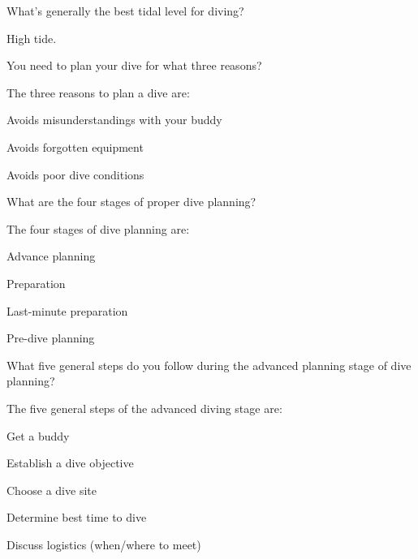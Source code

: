 	\begin{qanda}
		\begin{question}
What's generally the best tidal level for diving?
		\end{question}

		\begin{answer}
High tide.
		\end{answer}
	\end{qanda}

	\begin{qanda}
		\begin{question}
You need to plan your dive for what three reasons?
		\end{question}

		\begin{answer}
The three reasons to plan a dive are:
			\begin{nospacenumberedlist}
				\item Avoids misunderstandings with your buddy
				\item Avoids forgotten equipment
				\item Avoids poor dive conditions
			\end{nospacenumberedlist}
		\end{answer}
	\end{qanda}

	\begin{qanda}
		\begin{question}
What are the four stages of proper dive planning?
		\end{question}

		\begin{answer}
The four stages of dive planning are:
			\begin{nospacenumberedlist}
				\item Advance planning
				\item Preparation
				\item Last-minute preparation
				\item Pre-dive planning
			\end{nospacenumberedlist}
		\end{answer}
	\end{qanda}

	\begin{qanda}
		\begin{question}
What five general steps do you follow during the advanced planning stage of dive planning?
		\end{question}

		\begin{answer}
The five general steps of the advanced diving stage are:
			\begin{nospacenumberedlist}
				\item Get a buddy
				\item Establish a dive objective
				\item Choose a dive site
				\item Determine best time to dive
				\item Discuss logistics (when/where to meet)
			\end{nospacenumberedlist}
		\end{answer}
	\end{qanda}

